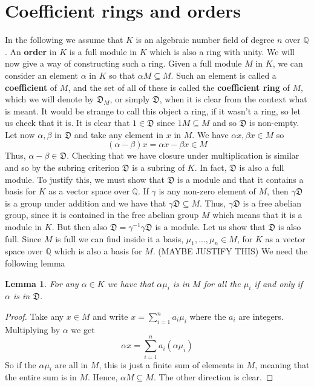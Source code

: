 \documentclass{article}
\newtheorem{lemma}{Lemma}[section]
\newcommand{\mfrak}[1]{\mathfrak{#1}}
\newcommand{\mbb}[1]{\mathbb{#1}}
\begin{document}
\section{Coefficient rings and orders}
In the following we assume that $K$ is an algebraic number field of degree $n$ over $\mbb Q$. An \textbf{order} in $K$ is a full module in $K$ which is also a ring with unity. We will now give a way of constructing such a ring. Given a full module $M$ in $K$, we can consider an element $\alpha$ in $K$ so that $\alpha M \subseteq M$. Such an element is called a \textbf{coefficient} of $M$, and the set of all of these is called the \textbf{coefficient ring} of $M$, which we will denote by $\mfrak D_M$, or simply $\mfrak D$, when it is clear from the context what is meant. It would be strange to call this object a ring, if it wasn't a ring, so let us check that it is. It is clear that $1 \in \mfrak{D}$ since $1 M \subseteq M$ and so $\mfrak{D}$ is non-empty. Let now $\alpha, \beta$ in $\mfrak D$ and take any element in $x$ in $M$. We have $\alpha x, \beta x \in M$ so $$(\alpha - \beta)x = \alpha x - \beta x \in M$$
Thus, $\alpha - \beta \in \mfrak{D}$. Checking that we have closure under multiplication is similar and so by the subring criterion $\mfrak{D}$ is a subring of $K$. In fact, $\mfrak{D}$ is also a full module. To justify this, we must show that $\mfrak{D}$ is a module and that it contains a basis for $K$ as a vector space over $\mbb Q$. If $\gamma$ is any non-zero element of $M$, then $\gamma \mfrak{D}$ is a group under addition and we have that $\gamma \mfrak{D} \subseteq M$. Thus, $\gamma \mfrak D$ is a free abelian group, since it is contained in the free abelian group $M$ which means that it is a module in $K$. But then also $\mfrak{D} = \gamma^{-1} \gamma \mfrak{D}$ is a module. Let us show that $\mfrak D$ is also full. Since $M$ is full we can find inside it a basis, $\mu_1, ..., \mu_n \in M$, for $K$ as a vector space over $\mbb Q$ which is also a basis for $M$. (MAYBE JUSTIFY THIS) We need the following lemma

\begin{lemma}\label{lem:SufficientConditionForCoefficient}
    For any $\alpha \in K$ we have that $\alpha \mu_i$ is in $M$ for all the $\mu_i$ if and only if $\alpha$ is in $\mfrak D$.
\end{lemma}
\begin{proof}
    Take any $x \in M$ and write $x = \sum_{i=1}^n a_i \mu_i$ where the $a_i$ are integers. Multiplying by $\alpha$ we get
    $$\alpha x = \sum_{i=1}^n a_i (\alpha \mu_i)$$
    So if the $\alpha \mu_i$ are all in $M$, this is just a finite sum of elements in $M$, meaning that the entire sum is in $M$. Hence, $\alpha M \subseteq M$. The other direction is clear. 
\end{proof}
\end{document}
